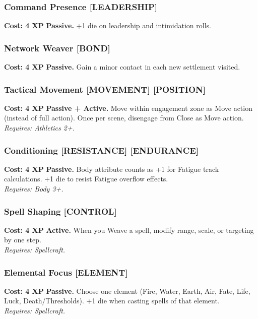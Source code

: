 \documentclass[12pt,a4paper]{book}
\begin{document}
\subsubsection*{Command Presence \textnormal{[LEADERSHIP]}}
\label{talent:command-presence}
\textbf{Cost: 4 XP} \textbf{Passive.} +1 die on leadership and intimidation rolls.

\subsubsection*{Network Weaver \textnormal{[BOND]}}
\label{talent:network-weaver}
\textbf{Cost: 4 XP} \textbf{Passive.} Gain a minor contact in each new settlement visited.

\subsubsection*{Tactical Movement \textnormal{[MOVEMENT] [POSITION]}}
\label{talent:tactical-movement}
\textbf{Cost: 4 XP} \textbf{Passive + Active.} Move within engagement zone as Move action (instead of full action). Once per scene, disengage from Close as Move action. \\
\textit{Requires: Athletics 2+.}

\subsubsection*{Conditioning \textnormal{[RESISTANCE] [ENDURANCE]}}
\label{talent:conditioning}
\textbf{Cost: 4 XP} \textbf{Passive.} Body attribute counts as +1 for Fatigue track calculations. +1 die to resist Fatigue overflow effects. \\
\textit{Requires: Body 3+.}

\subsubsection*{Spell Shaping \textnormal{[CONTROL]}}
\label{talent:spell-shaping}
\textbf{Cost: 4 XP} \textbf{Active.} When you Weave a spell, modify range, scale, or targeting by one step. \\
\textit{Requires: Spellcraft.}

\subsubsection*{Elemental Focus \textnormal{[ELEMENT]}}
\label{talent:elemental-focus}
\textbf{Cost: 4 XP} \textbf{Passive.} Choose one element (Fire, Water, Earth, Air, Fate, Life, Luck, Death/Thresholds). +1 die when casting spells of that element. \\
\textit{Requires: Spellcraft.}
\end{document}
